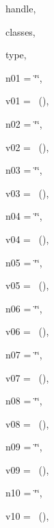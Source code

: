 {\begin{DoxyParamCaption}
\item[{uint16\+\_\+t}]{handle, }
\item[{const {\bf Class\+Id\+List} \&}]{classes, }
\item[{std\+::string}]{type, }
\item[{std\+::string}]{n01 = {\ttfamily \char`\"{}\char`\"{}}, }
\item[{const {\bf Attribute\+Value} \&}]{v01 = {~()}, }
\item[{std\+::string}]{n02 = {\ttfamily \char`\"{}\char`\"{}}, }
\item[{const {\bf Attribute\+Value} \&}]{v02 = {~()}, }
\item[{std\+::string}]{n03 = {\ttfamily \char`\"{}\char`\"{}}, }
\item[{const {\bf Attribute\+Value} \&}]{v03 = {~()}, }
\item[{std\+::string}]{n04 = {\ttfamily \char`\"{}\char`\"{}}, }
\item[{const {\bf Attribute\+Value} \&}]{v04 = {~()}, }
\item[{std\+::string}]{n05 = {\ttfamily \char`\"{}\char`\"{}}, }
\item[{const {\bf Attribute\+Value} \&}]{v05 = {~()}, }
\item[{std\+::string}]{n06 = {\ttfamily \char`\"{}\char`\"{}}, }
\item[{const {\bf Attribute\+Value} \&}]{v06 = {~()}, }
\item[{std\+::string}]{n07 = {\ttfamily \char`\"{}\char`\"{}}, }
\item[{const {\bf Attribute\+Value} \&}]{v07 = {~()}, }
\item[{std\+::string}]{n08 = {\ttfamily \char`\"{}\char`\"{}}, }
\item[{const {\bf Attribute\+Value} \&}]{v08 = {~()}, }
\item[{std\+::string}]{n09 = {\ttfamily \char`\"{}\char`\"{}}, }
\item[{const {\bf Attribute\+Value} \&}]{v09 = {~()}, }
\item[{std\+::string}]{n10 = {\ttfamily \char`\"{}\char`\"{}}, }
\item[{const {\bf Attribute\+Value} \&}]{v10 = {~()}, }

\end{DoxyParamCaption}}
